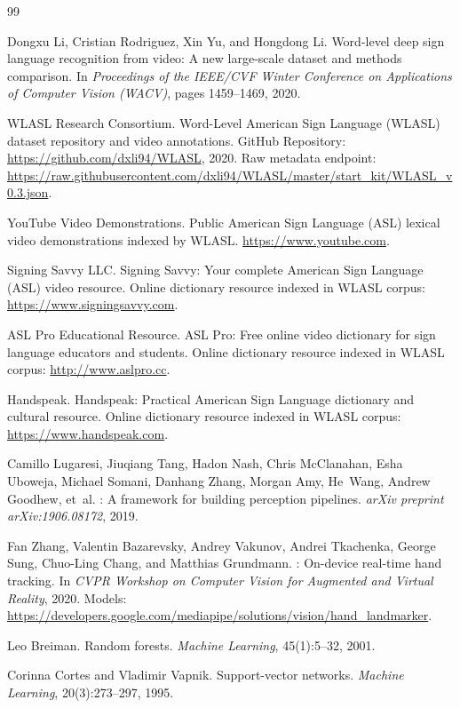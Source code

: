 \documentclass{article}
\begin{document}
\begin{thebibliography}{99}

Dongxu Li, Cristian Rodriguez, Xin Yu, and Hongdong Li.
\newblock Word-level deep sign language recognition from video: A new large-scale dataset and methods comparison.
\newblock In \emph{Proceedings of the IEEE/CVF Winter Conference on Applications of Computer Vision (WACV)}, pages 1459--1469, 2020.

WLASL Research Consortium.
\newblock Word-Level American Sign Language (WLASL) dataset repository and video annotations.
\newblock GitHub Repository: \url{https://github.com/dxli94/WLASL}, 2020.
\newblock Raw metadata endpoint: \url{https://raw.githubusercontent.com/dxli94/WLASL/master/start_kit/WLASL_v0.3.json}.

YouTube Video Demonstrations.
\newblock Public American Sign Language (ASL) lexical video demonstrations indexed by WLASL.
\newblock \url{https://www.youtube.com}.

Signing Savvy LLC.
\newblock Signing Savvy: Your complete American Sign Language (ASL) video resource.
\newblock Online dictionary resource indexed in WLASL corpus: \url{https://www.signingsavvy.com}.

ASL Pro Educational Resource.
\newblock ASL Pro: Free online video dictionary for sign language educators and students.
\newblock Online dictionary resource indexed in WLASL corpus: \url{http://www.aslpro.cc}.

Handspeak.
\newblock Handspeak: Practical American Sign Language dictionary and cultural resource.
\newblock Online dictionary resource indexed in WLASL corpus: \url{https://www.handspeak.com}.

Camillo Lugaresi, Jiuqiang Tang, Hadon Nash, Chris McClanahan, Esha Uboweja, Michael Somani, Danhang Zhang, Morgan Amy, He~Wang, Andrew Goodhew, et~al.
: A framework for building perception pipelines.
\newblock \emph{arXiv preprint arXiv:1906.08172}, 2019.

Fan Zhang, Valentin Bazarevsky, Andrey Vakunov, Andrei Tkachenka, George Sung, Chuo-Ling Chang, and Matthias Grundmann.
: On-device real-time hand tracking.
\newblock In \emph{CVPR Workshop on Computer Vision for Augmented and Virtual Reality}, 2020.
\newblock Models: \url{https://developers.google.com/mediapipe/solutions/vision/hand_landmarker}.

Leo Breiman.
\newblock Random forests.
\newblock \emph{Machine Learning}, 45(1):5--32, 2001.

Corinna Cortes and Vladimir Vapnik.
\newblock Support-vector networks.
\newblock \emph{Machine Learning}, 20(3):273--297, 1995.

\end{thebibliography}
\end{document}
